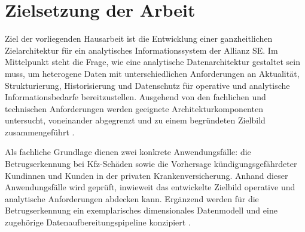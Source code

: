 \section{Zielsetzung der Arbeit}
\label{sec:zielsetzung}

Ziel der vorliegenden Hausarbeit ist die Entwicklung einer ganzheitlichen
Zielarchitektur für ein analytisches Informationssystem der Allianz
SE. Im Mittelpunkt steht die Frage, wie eine analytische Datenarchitektur
gestaltet sein muss, um heterogene Daten mit unterschiedlichen Anforderungen
an Aktualität, Strukturierung, Historisierung und Datenschutz für operative
und analytische Informationsbedarfe bereitzustellen. Ausgehend von den
fachlichen und technischen Anforderungen werden geeignete
Architekturkomponenten untersucht, voneinander abgegrenzt und zu einem
begründeten Zielbild zusammengeführt \citep{schulz2024}.

Als fachliche Grundlage dienen zwei konkrete Anwendungsfälle: die
Betrugserkennung bei Kfz-Schäden sowie die Vorhersage kündigungsgefährdeter
Kundinnen und Kunden in der privaten Krankenversicherung. Anhand dieser
Anwendungsfälle wird geprüft, inwieweit das entwickelte Zielbild operative und
analytische Anforderungen abdecken kann. Ergänzend werden für die
Betrugserkennung ein exemplarisches dimensionales Datenmodell und
eine zugehörige Datenaufbereitungspipeline konzipiert
\citep{kimball2013,gerlachSchulz2026}.
